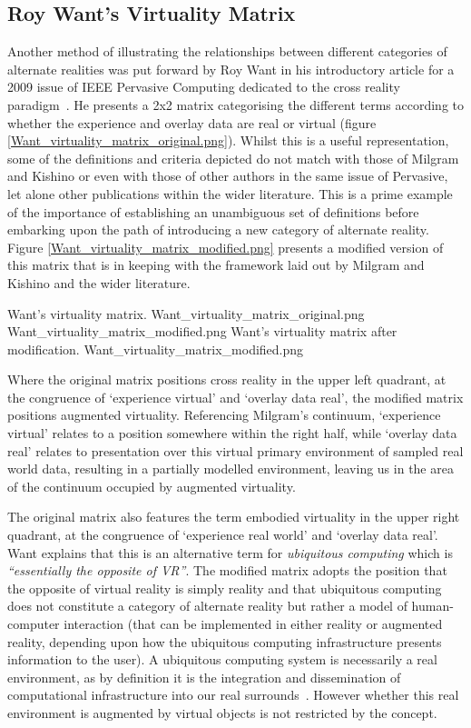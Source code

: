 \subsection{Roy Want's Virtuality Matrix}
\label{roy-wants-virtuality-matrix}
Another method of illustrating the relationships between different categories of alternate realities was put forward by Roy Want in his introductory article for a 2009 issue of IEEE Pervasive Computing dedicated to the cross reality paradigm~\cite{Want2009}. He presents a 2x2 matrix categorising the different terms according to whether the experience and overlay data are real or virtual (figure \ref{Want_virtuality_matrix_original.png}). Whilst this is a useful representation, some of the definitions and criteria depicted do not match with those of Milgram and Kishino or even with those of other authors in the same issue of Pervasive, let alone other publications within the wider literature. This is a prime example of the importance of establishing an unambiguous set of definitions before embarking upon the path of introducing a new category of alternate reality. Figure \ref{Want_virtuality_matrix_modified.png} presents a modified version of this matrix that is in keeping with the framework laid out by Milgram and Kishino and the wider literature.

 {Want's virtuality matrix.} {Want_virtuality_matrix_original.png}
       {Want_virtuality_matrix_modified.png} {Want's virtuality matrix after modification.} {Want_virtuality_matrix_modified.png}

Where the original matrix positions cross reality in the upper left quadrant, at the congruence of `experience virtual' and `overlay data real', the modified matrix positions augmented virtuality. Referencing Milgram's continuum, `experience virtual' relates to a position somewhere within the right half, while `overlay data real' relates to presentation over this virtual primary environment of sampled real world data, resulting in a partially modelled environment, leaving us in the area of the continuum occupied by augmented virtuality.

The original matrix also features the term embodied virtuality in the upper right quadrant, at the congruence of `experience real world' and `overlay data real'. Want explains that this is an alternative term for \textit{ubiquitous computing} which is \textit{``essentially the opposite of VR''}. The modified matrix adopts the position that the opposite of virtual reality is simply reality and that ubiquitous computing does not constitute a category of alternate reality but rather a model of human-computer interaction (that can be implemented in either reality or augmented reality, depending upon how the ubiquitous computing infrastructure presents information to the user). A ubiquitous computing system is necessarily a real environment, as by definition it is the integration and dissemination of computational infrastructure into our real surrounds~\cite{York2004}. However whether this real environment is augmented by virtual objects is not restricted by the concept.


